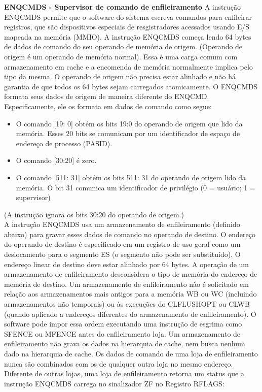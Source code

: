 \documentclass[12pt,a4paper,brazilian,utf8]{ppgsi}
\begin{document}
    \textbf {ENQCMDS - Supervisor de comando de enfileiramento}
    A instrução ENQCMDS permite que o software do sistema escreva comandos para enfileirar registros, que são dispositivos especiais de resgistradores acessados usando E/S mapeada na memória (MMIO).
    A instrução ENQCMDS começa lendo 64 bytes de dados de comando do seu operando de memória de origem. (Operando de origem é um operando de memória normal). Essa é uma carga comum com armazenamento em cache e a encomenda de memória normalmente implica  pelo tipo da mesma. O operando de origem não precisa estar alinhado e não há garantia de que todos os 64 bytes sejam carregados atomicamente.
    O ENQCMDS formata seus dados de origem de maneira diferente do ENQCMD. Especificamente, ele os formata em dados de comando como segue:
    \begin{itemize}
        \item O comando [19: 0] obtém os bits 19:0 do operando de origem que lido da memória. Esses 20 bits se comunicam por um identificador de espaço de endereço de processo (PASID).
        \item O comando [30:20] é zero.
        \item O comando [511: 31] obtém os bits 511: 31 do operando de origem lido da memória. O bit 31 comunica um identificador de privilégio (0 = usuário; 1 = supervisor)
    \end{itemize}
    (A instrução ignora os bits 30:20 do operando de origem.)
    \\A instrução ENQCMDS usa um armazenamento de enfileiramento (definido abaixo) para gravar esses dados de comando no operando de destino. O endereço do operando de destino é especificado em um registro de uso geral como um deslocamento para o segmento ES (o segmento não pode ser substituído). O endereço linear de destino deve estar alinhado por 64 bytes. A operação de um armazenamento de enfileiramento desconsidera o tipo de memória do endereço de memória de destino. Um armazenamento de enfileiramento não é solicitado em relação aos armazenamentos mais antigos para a memória WB ou WC (incluindo armazenamentos não temporais) ou às execuções do CLFLUSHOPT ou CLWB (quando aplicado a endereços diferentes do armazenamento de enfileiramento). O software pode impor essa ordem executando uma instrução de esgrima como SFENCE ou MFENCE antes do enfileiramento loja. Um armazenamento de enfileiramento não grava os dados na hierarquia de cache, nem busca nenhum dado na hierarquia de cache. Os dados de comando de uma loja de enfileiramento nunca são combinados com os de qualquer outra loja no mesmo endereço. Diferente de outras lojas, uma loja de enfileiramento retorna um status que a instrução ENQCMDS carrega no sinalizador ZF no Registro RFLAGS:
\end{document}
